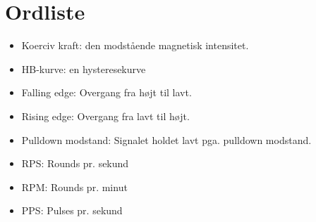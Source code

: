 \section{Ordliste}
\label{ordliste}
\begin{itemize}
\item Koerciv kraft: den modstående magnetisk intensitet.
\item HB-kurve: en hysteresekurve
\item Falling edge: Overgang fra højt til lavt.
\item Rising edge: Overgang fra lavt til højt.
\item Pulldown modstand: Signalet holdet lavt pga. pulldown modstand. 
\item RPS: Rounds pr. sekund 
\item RPM: Rounds pr. minut
\item PPS: Pulses pr. sekund
\end{itemize}
